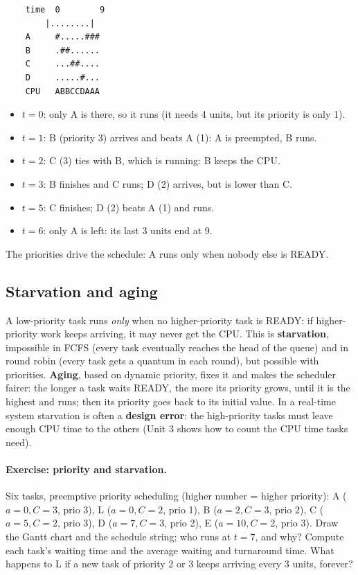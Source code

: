 \begin{verbatim}
    time  0        9
        |........|
    A     #.....###
    B     .##......
    C     ...##....
    D     .....#...
    CPU   ABBCCDAAA
\end{verbatim}

\begin{itemize}
    \item $t=0$: only A is there, so it runs (it needs 4 units, but its priority is only 1).
    \item $t=1$: B (priority 3) arrives and beats A (1): A is preempted, B runs.
    \item $t=2$: C (3) ties with B, which is running: B keeps the CPU.
    \item $t=3$: B finishes and C runs; D (2) arrives, but is lower than C.
    \item $t=5$: C finishes; D (2) beats A (1) and runs.
    \item $t=6$: only A is left: its last 3 units end at 9.
\end{itemize}
The priorities drive the schedule: A runs only when nobody else is READY.

\subsection{Starvation and aging}
A low-priority task runs \emph{only} when no higher-priority task is READY: if higher-priority work keeps arriving, it may never get the CPU. This is \textbf{starvation}, impossible in FCFS (every task eventually reaches the head of the queue) and in round robin (every task gets a quantum in each round), but possible with priorities. \textbf{Aging}, based on dynamic priority, fixes it and makes the scheduler fairer: the longer a task waits READY, the more its priority grows, until it is the highest and runs; then its priority goes back to its initial value. In a real-time system starvation is often a \textbf{design error}: the high-priority tasks must leave enough CPU time to the others (Unit 3 shows how to count the CPU time tasks need).

\paragraph{Exercise: priority and starvation.} Six tasks, preemptive priority scheduling (higher number = higher priority): A ($a=0, C=3$, prio 3), L ($a=0, C=2$, prio 1), B ($a=2, C=3$, prio 2), C ($a=5, C=2$, prio 3), D ($a=7, C=3$, prio 2), E ($a=10, C=2$, prio 3). Draw the Gantt chart and the schedule string; who runs at $t=7$, and why? Compute each task's waiting time and the average waiting and turnaround time. What happens to L if a new task of priority 2 or 3 keeps arriving every 3 units, forever?

